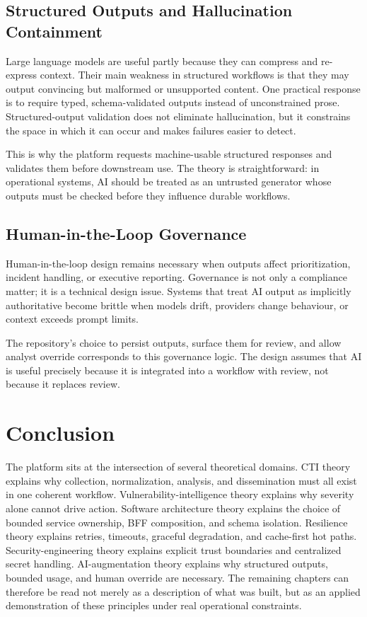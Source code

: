 \subsection{Structured Outputs and Hallucination Containment}
Large language models are useful partly because they can compress and re-express context. Their main weakness in structured workflows is that they may output convincing but malformed or unsupported content. One practical response is to require typed, schema-validated outputs instead of unconstrained prose. Structured-output validation does not eliminate hallucination, but it constrains the space in which it can occur and makes failures easier to detect.

This is why the platform requests machine-usable structured responses and validates them before downstream use. The theory is straightforward: in operational systems, AI should be treated as an untrusted generator whose outputs must be checked before they influence durable workflows.

\subsection{Human-in-the-Loop Governance}
Human-in-the-loop design remains necessary when outputs affect prioritization, incident handling, or executive reporting. Governance is not only a compliance matter; it is a technical design issue. Systems that treat AI output as implicitly authoritative become brittle when models drift, providers change behaviour, or context exceeds prompt limits.

The repository's choice to persist outputs, surface them for review, and allow analyst override corresponds to this governance logic. The design assumes that AI is useful precisely because it is integrated into a workflow with review, not because it replaces review.

\section*{Conclusion}
The platform sits at the intersection of several theoretical domains. CTI theory explains why collection, normalization, analysis, and dissemination must all exist in one coherent workflow. Vulnerability-intelligence theory explains why severity alone cannot drive action. Software architecture theory explains the choice of bounded service ownership, BFF composition, and schema isolation. Resilience theory explains retries, timeouts, graceful degradation, and cache-first hot paths. Security-engineering theory explains explicit trust boundaries and centralized secret handling. AI-augmentation theory explains why structured outputs, bounded usage, and human override are necessary. The remaining chapters can therefore be read not merely as a description of what was built, but as an applied demonstration of these principles under real operational constraints.
